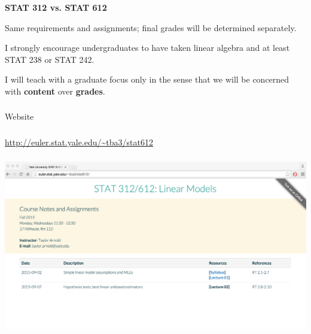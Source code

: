 \begin{frame}[fragile] \frametitle{}

{\bf STAT 312 vs. STAT 612} \pause

Same requirements and assignments; final grades will be determined
separately. \pause

I strongly encourage undergraduates to have taken linear
algebra and at least STAT 238 or STAT 242. \pause

I will teach with a graduate focus only in the sense that we
will be concerned with {\bf content} over {\bf grades}.

\end{frame}

\begin{frame}[fragile] \frametitle{}

\begin{flushright}
{\color{yaleblue}\sc\fontsize{1cm}{0cm}\selectfont Website}
\end{flushright}

\end{frame}


\begin{frame}[fragile] \frametitle{}

{\fontsize{0.5cm}{0cm}\selectfont
\url{http://euler.stat.yale.edu/~tba3/stat612}
}

\end{frame}

\begin{frame}[fragile] \frametitle{}

\includegraphics[width=\linewidth]{img/websiteScreenshot.pdf}

\end{frame}

